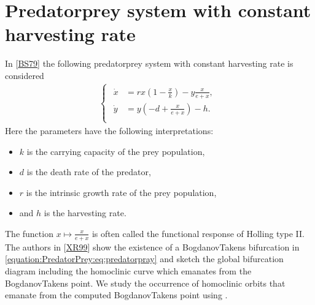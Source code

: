 \documentclass[letterpaper,10pt,english]{jupyterBook}
\begin{document}
\chapter{Predator\sphinxhyphen{}prey system with constant harvesting rate}
\label{\detokenize{PredatorPrey:predator-prey-system-with-constant-harvesting-rate}}\label{\detokenize{PredatorPrey::doc}}
\sphinxAtStartPar
In {[}\hyperlink{cite.references:id7}{BS79}{]} the following predator\sphinxhyphen{}prey system with constant
harvesting rate is considered
\begin{equation}\label{equation:PredatorPrey:eq:predatorpray}
\begin{split}\begin{cases}
\begin{aligned}
\dot x &= rx\left(1-\frac x k\right) - y \frac x {e+x}, \\
\dot y &= y\left(-d+\frac x {e+x}\right) - h. \\
\end{aligned}
\end{cases}\end{split}
\end{equation}
\sphinxAtStartPar
Here the parameters have the following interpretations:
\begin{itemize}
\item {} 
\sphinxAtStartPar
\(k\) is the carrying capacity of the prey population,

\item {} 
\sphinxAtStartPar
\(d\) is the death rate of the predator,

\item {} 
\sphinxAtStartPar
\(r\) is the intrinsic growth rate of the prey population,

\item {} 
\sphinxAtStartPar
and \(h\) is the harvesting rate.

\end{itemize}

\sphinxAtStartPar
The function \(x \mapsto \frac{x}{e+x}\) is often called the functional response
of Holling type II. The authors in {[}\hyperlink{cite.references:id8}{XR99}{]} show the existence of a
Bogdanov\sphinxhyphen{}Takens bifurcation in \eqref{equation:PredatorPrey:eq:predatorpray} and sketch the global
bifurcation diagram including the homoclinic curve which emanates from the
Bogdanov\sphinxhyphen{}Takens point.  We study the occurrence of homoclinic orbits that
emanate from the computed Bogdanov\sphinxhyphen{}Takens point using .
\end{document}
